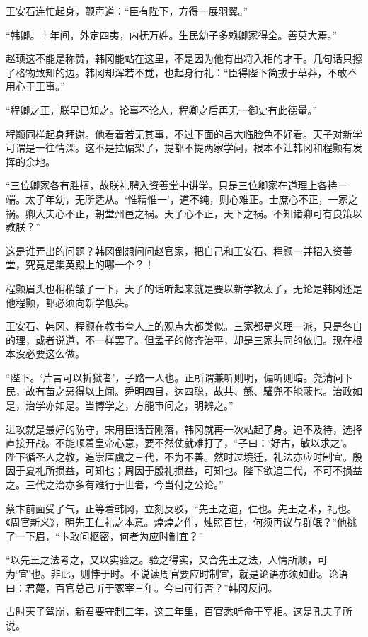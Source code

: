 王安石连忙起身，颤声道：“臣有陛下，方得一展羽翼。”

“韩卿。十年间，外定四夷，内抚万姓。生民幼子多赖卿家得全。善莫大焉。”

赵顼这不能是称赞，韩冈能站在这里，不是因为他有出将入相的才干。几句话只擦了格物致知的边。韩冈却浑若不觉，也起身行礼：“臣得陛下简拔于草莽，不敢不用心于王事。”

“程卿之正，朕早已知之。论事不论人，程卿之后再无一御史有此德量。”

程颢同样起身拜谢。他看着若无其事，不过下面的吕大临脸色不好看。天子对新学可谓是一往情深。这不是拉偏架了，提都不提两家学问，根本不让韩冈和程颢有发挥的余地。

“三位卿家各有胜擅，故朕礼聘入资善堂中讲学。只是三位卿家在道理上各持一端。太子年幼，无所适从。‘惟精惟一’，道不纯，则心难正。士庶心不正，一家之祸。卿大夫心不正，朝堂州邑之祸。天子心不正，天下之祸。不知诸卿可有良策以教朕？”

这是谁弄出的问题？韩冈倒想问问赵官家，把自己和王安石、程颢一并招入资善堂，究竟是集英殿上的哪一个？！

程颢眉头也稍稍皱了一下，天子的话听起来就是要以新学教太子，无论是韩冈还是他程颢，都必须向新学低头。

王安石、韩冈、程颢在教书育人上的观点大都类似。三家都是义理一派，只是各自的理，或者说道，不一样罢了。但孟子的修齐治平，却是三家共同的依归。现在根本没必要这么做。

“陛下。‘片言可以折狱者’，子路一人也。正所谓兼听则明，偏听则暗。尧清问下民，故有苗之恶得以上闻。舜明四目，达四聪，故共、鲧、驩兜不能蔽也。治政如是，治学亦如是。当博学之，方能审问之，明辨之。”

进攻就是最好的防守，宋用臣话音刚落，韩冈就再一次站起了身。迫不及待，选择直接开战。不能顺着皇帝心意，要不然仗就难打了，“子曰：‘好古，敏以求之’。陛下循圣人之教，追崇唐虞之三代，不为不善。然时过境迁，礼法亦应时制宜。殷因于夏礼所损益，可知也；周因于殷礼损益，可知也。陛下欲追三代，不可不损益之。三代之治亦多有难行于世者，今当付之公论。”

蔡卞前面受了气，正等着韩冈，立刻反驳，“先王之道，仁也。先王之术，礼也。《周官新义》，明先王仁礼之本意。煌煌之作，烛照百世，何须再议与群氓？”他挑了一下眉，“卞敢问枢密，何者为应时制宜？”

“以先王之法考之，又以实验之。验之得实，又合先王之法，人情所顺，可为‘宜’也。非此，则悖于时。不说读周官要应时制宜，就是论语亦须如此。论语曰：君薨，百官总己听于冢宰三年。今曰可行否？”韩冈反问。

古时天子驾崩，新君要守制三年，这三年里，百官悉听命于宰相。这是孔夫子所说。

